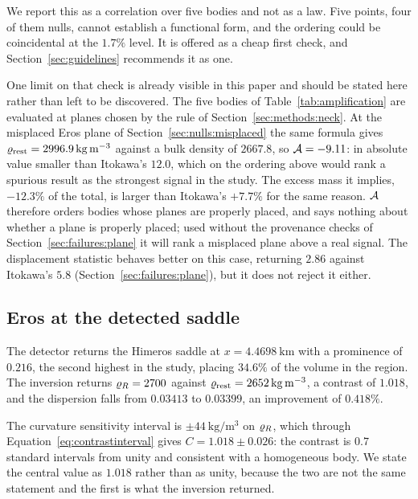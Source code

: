 We report this as a correlation over five bodies and not as a law. Five
points, four of them nulls, cannot establish a functional form, and the
ordering could be coincidental at the $1.7\%$ level. It is offered as a
cheap first check, and Section~\ref{sec:guidelines} recommends it as one.

One limit on that check is already visible in this paper and should be
stated here rather than left to be discovered. The five bodies of
Table~\ref{tab:amplification} are evaluated at planes chosen by the rule of
Section~\ref{sec:methods:neck}. At the misplaced Eros plane of
Section~\ref{sec:nulls:misplaced} the same formula gives
$\varrho_{\mathrm{rest}} = \SI{2996.9}{\kilo\gram\per\cubic\metre}$ against a bulk
density of $2667.8$, so $\mathcal{A} = -9.11$: in absolute value smaller than
Itokawa's $12.0$, which on the ordering above would rank a spurious result
as the strongest signal in the study. The excess mass it implies,
$-12.3\%$ of the total, is larger than Itokawa's $+7.7\%$ for the same
reason. $\mathcal{A}$ therefore orders bodies whose planes are properly placed,
and says nothing about whether a plane is properly placed; used without the
provenance checks of Section~\ref{sec:failures:plane} it will rank a
misplaced plane above a real signal. The displacement statistic behaves
better on this case, returning $2.86$ against Itokawa's $5.8$
(Section~\ref{sec:failures:plane}), but it does not reject it either.

\subsection{Eros at the detected saddle}
\label{sec:nulls:eros}

The detector returns the Himeros saddle at $x = \SI{+4.4698}{\kilo\metre}$
with a prominence of $0.216$, the second highest in the study, placing
$34.6\%$ of the volume in the region. The inversion returns
$\varrho_{R} = 2700$ against $\varrho_{\mathrm{rest}} = \SI{2652}{\kilo\gram\per\cubic\metre}$,
a contrast of $1.018$, and the dispersion falls from $0.03413$ to
$0.03399$, an improvement of $0.418\%$.

The curvature sensitivity interval is
$\pm\SI{44}{\kilo\gram\per\cubic\metre}$ on $\varrho_{R}$, which through
Equation~\eqref{eq:contrastinterval} gives $C = 1.018 \pm 0.026$: the
contrast is $0.7$ standard intervals from unity and consistent with a
homogeneous body. We state the central value as $1.018$ rather than as
unity, because the two are not the same statement and the first is what
the inversion returned.

